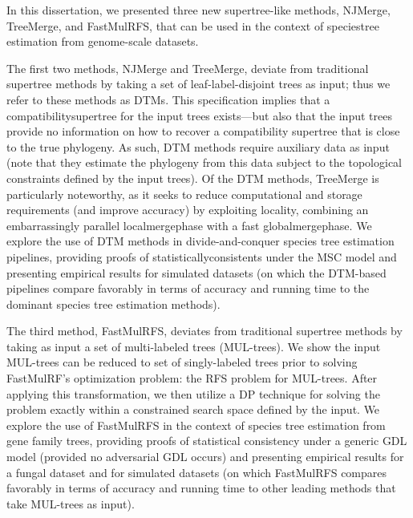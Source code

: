 In this dissertation, we presented three new \gls{supertree}-like methods, \gls{NJMerge}, \gls{TreeMerge}, and \gls{FastMulRFS}, that can be used in the context of \gls{speciestree} estimation from \gls{genome-scale} datasets. 

The first two methods, NJMerge and TreeMerge, deviate from traditional supertree methods by taking a set of \gls{leaf-label-disjoint} trees as input; thus we refer to these methods as \glspl{DTM}.
This specification implies that a \gls{compatibilitysupertree} for the input trees exists---but also that the input trees provide no information on how to recover a compatibility supertree that is close to the true \gls{phylogeny}.
As such, DTM methods require auxiliary data as input (note that they estimate the phylogeny from this data subject to the topological constraints defined by the input trees).
Of the DTM methods, TreeMerge is particularly noteworthy, as it seeks to reduce computational and storage requirements (and improve accuracy) by exploiting locality, combining an embarrassingly parallel \gls{localmergephase} with a fast \gls{globalmergephase}.
We explore the use of DTM methods in divide-and-conquer species tree estimation pipelines, providing proofs of \glspl{statisticallyconsistent} under the \gls{MSC} model and presenting empirical results for simulated datasets (on which the DTM-based pipelines compare favorably in terms of accuracy and running time to the dominant species tree estimation methods).

The third method, FastMulRFS, deviates from traditional supertree methods by taking as input a set of \gls{multi-labeled} trees (\glspl{MUL-tree}).
We show the input MUL-trees can be reduced to set of \gls{singly-labeled} trees prior to solving FastMulRF's optimization problem: the \gls{RFS} problem for MUL-trees.
After applying this transformation, we then utilize a \gls{DP} technique for solving the  problem exactly within a constrained search space defined by the input. 
We explore the use of FastMulRFS in the context of species tree estimation from gene family trees, providing proofs of statistical consistency under a generic \gls{GDL} model (provided no adversarial GDL occurs) and presenting empirical results for a fungal dataset and for simulated datasets (on which FastMulRFS compares favorably in terms of accuracy and running time to other leading methods that take MUL-trees as input).

